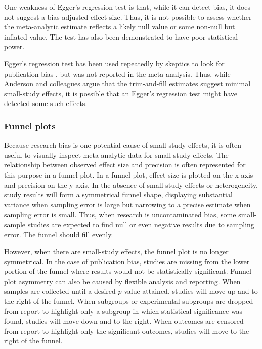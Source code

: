 \documentclass[man]{apa6}
\begin{document}
One weakness of Egger's regression test is that, while it can detect bias, it does not suggest a bias-adjusted effect size. Thus, it is not possible to assess whether the meta-analytic estimate reflects a likely null value or some non-null but inflated value. The test has also been demonstrated to have poor statistical power. %

Egger's regression test has been used repeatedly by skeptics to look for publication bias \citep[e.g.,][]{Ferguson:2007,Ferguson:Kilburn:2009}, but was not reported in the \citet{Anderson:etal:2010} meta-analysis. Thus, while Anderson and colleagues argue that the trim-and-fill estimates suggest minimal small-study effects, it is possible that an Egger's regression test might have detected some such effects.

\subsubsection{Funnel plots}
Because research bias is one potential cause of small-study effects, it is often useful to visually inspect meta-analytic data for small-study effects. The relationship between observed effect size and precision is often represented for this purpose in a funnel plot. In a funnel plot, effect size is plotted on the x-axis and precision on the y-axis. In the absence of small-study effects or heterogeneity, study results will form a symmetrical funnel shape, displaying substantial variance when sampling error is large but narrowing to a precise estimate when sampling error is small. Thus, when research is uncontaminated bias, some small-sample studies are expected to find null or even negative results due to sampling error. The funnel should fill evenly.

However, when there are small-study effects, the funnel plot is no longer symmetrical. In the case of publication bias, studies are missing from the lower portion of the funnel where results would not be statistically significant. Funnel-plot asymmetry can also be caused by flexible analysis and reporting. When samples are collected until a desired $p$-value attained, studies will move up and to the right of the funnel. When subgroups or experimental subgroups are dropped from report to highlight only a subgroup in which statistical significance was found, studies will move down and to the right. When outcomes are censored from report to highlight only the significant outcomes, studies will move to the right of the funnel.
\end{document}
